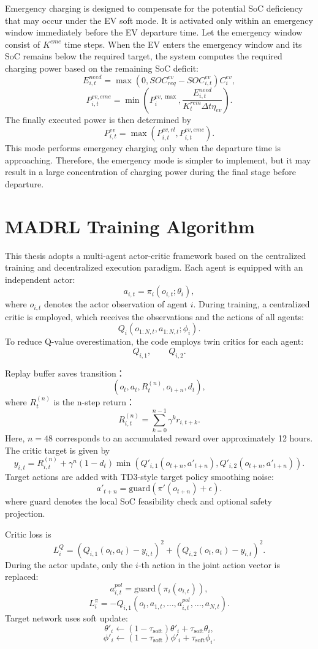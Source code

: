 Emergency charging is designed to compensate for the potential SoC deficiency that may occur under the EV soft mode. It is activated only within an emergency window immediately before the EV departure time. Let the emergency window consist of \(K^{eme}\) time steps. When the EV enters the emergency window and its SoC remains below the required target, the system computes the required charging power based on the remaining SoC deficit:
\[
  E^{need}_{i,t}
  =
  \max(0,SOC^{ev}_{req}-SOC^{ev}_{i,t})C^{ev}_i,
\]
\[
  P^{ev,eme}_{i,t}
  =
  \min
  \left(
  P^{ev,\max}_i,
  \frac{E^{need}_{i,t}}{K^{rem}_t\Delta t\eta_{ev}}
  \right).
\]
The finally executed power is then determined by
\[
  P^{ev}_{i,t}
  =
  \max(P^{ev,rl}_{i,t},P^{ev,eme}_{i,t}).
\]
This mode performs emergency charging only when the departure time is approaching. Therefore, the emergency mode is simpler to implement, but it may result in a large concentration of charging power during the final stage before departure.

\section{MADRL Training Algorithm}

This thesis adopts a multi-agent actor-critic framework based on the centralized training and decentralized execution paradigm. Each agent is equipped with an independent actor:
\[
  a_{i,t}=\pi_i(o_{i,t};\theta_i),
\]
where \(o_{i,t}\) denotes the actor observation of agent \(i\). During training, a centralized critic is employed, which receives the observations and the actions of all agents:
\[
  Q_i(o_{1:N,t},a_{1:N,t};\phi_i).
\]
To reduce Q-value overestimation, the code employs twin critics for each agent:
\[
  Q_{i,1},\qquad Q_{i,2}.
\]

Replay buffer saves transition：
\[
  (o_t,a_t,R^{(n)}_t,o_{t+n},d_t),
\]
where \(R^{(n)}_t\) is the n-step return：
\[
  R^{(n)}_{i,t}
  =
  \sum_{k=0}^{n-1}\gamma^k r_{i,t+k}.
\]
Here, \(n=48\) corresponds to an accumulated reward over approximately 12 hours. The critic target is given by
\[
  y_{i,t}
  =
  R^{(n)}_{i,t}
  +
  \gamma^n(1-d_t)
  \min(Q'_{i,1}(o_{t+n},a'_{t+n}),Q'_{i,2}(o_{t+n},a'_{t+n})).
\]
Target actions are added with TD3-style target policy smoothing noise:
\[
  a'_{t+n}
  =
  \mathrm{guard}
  \left(
  \pi'(o_{t+n})+\epsilon
  \right).
\]
where \(\mathrm{guard}\) denotes the local SoC feasibility check and optional safety projection.

Critic loss is
\[
  L^Q_i
  =
  (Q_{i,1}(o_t,a_t)-y_{i,t})^2
  +
  (Q_{i,2}(o_t,a_t)-y_{i,t})^2.
\]
During the actor update, only the \(i\)-th action in the joint action vector is replaced:
\[
  a^{pol}_{i,t}=\mathrm{guard}(\pi_i(o_{i,t})),
\]
\[
  L^{\pi}_i
  =
  -Q_{i,1}(o_t,a_{1,t},\ldots,a^{pol}_{i,t},\ldots,a_{N,t}).
\]
Target network uses soft update:
\[
  \theta'_i\leftarrow(1-\tau_{\mathrm{soft}})\theta'_i+\tau_{\mathrm{soft}}\theta_i,
\]
\[
  \phi'_i\leftarrow(1-\tau_{\mathrm{soft}})\phi'_i+\tau_{\mathrm{soft}}\phi_i.
\]

